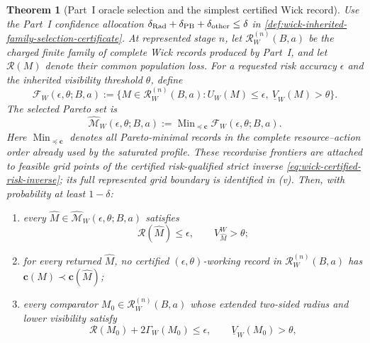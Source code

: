\documentclass[11pt]{article}
\numberwithin{section}{part}
\theoremstyle{plain}
\newtheorem{theorem}{Theorem}[section]
\theoremstyle{definition}
\theoremstyle{remark}
\begin{document}
\begin{theorem}[Part~I oracle selection and the simplest certified Wick record]
\label{thm:wick-simplest-certified-model}
Use the Part~I confidence allocation
\(\delta_{\rm Rad}+\delta_{\rm PB}+\delta_{\rm other}\le\delta\) in
\cref{def:wick-inherited-family-selection-certificate}.  At represented
stage \(n\), let \(\mathscr R_W^{(n)}(B,a)\) be the charged finite family of
complete Wick records produced by Part~I, and let \(\mathcal R(M)\) denote
their common population loss.  For a requested risk accuracy \(\epsilon\)
and the inherited visibility threshold \(\theta\), define
\begin{equation}
 \label{eq:wick-certified-complexity-selector}
 \mathscr F_W(\epsilon,\theta;B,a)
 :=\{M\in\mathscr R_W^{(n)}(B,a):
       U_W(M)\le\epsilon,\ \underline V_W(M)>\theta\}.
\end{equation}
The selected Pareto set is
\begin{equation}
 \widehat{\mathscr M}_W(\epsilon,\theta;B,a)
 :=\operatorname{Min}_{\preceq\mathbf c}
   \mathscr F_W(\epsilon,\theta;B,a).
\end{equation}
Here \(\operatorname{Min}_{\preceq\mathbf c}\) denotes all Pareto-minimal
records in the complete resource--action order already used by the saturated
profile.  These recordwise frontiers are attached to feasible grid points of
the certified risk-qualified strict inverse
\eqref{eq:wick-certified-risk-inverse}; its full represented grid boundary is identified
in \textup{(v)}.  Then, with probability at least
\(1-\delta\):
\begin{enumerate}[label=\textup{(\roman*)}]
\item every
\(\widehat M\in\widehat{\mathscr M}_W(\epsilon,\theta;B,a)\) satisfies
\begin{equation}
 \label{eq:wick-certified-working-bound}
 \mathcal R(\widehat M)\le\epsilon,
 \qquad V^W_{\widehat M}>\theta;
\end{equation}
\item for every returned \(\widehat M\), no certified
\((\epsilon,\theta)\)-working record in
\(\mathscr R_W^{(n)}(B,a)\) has
\(\mathbf c(M)\prec\mathbf c(\widehat M)\);
\item every comparator \(M_0\in\mathscr R_W^{(n)}(B,a)\) whose extended
two-sided radius and lower visibility satisfy
\begin{equation}
 \label{eq:wick-certified-comparator-margin}
 \mathcal R(M_0)+2\Gamma_W(M_0)\le\epsilon,
 \qquad \underline V_W(M_0)>\theta,
\end{equation}

\end{enumerate}
\end{theorem}
\end{document}
